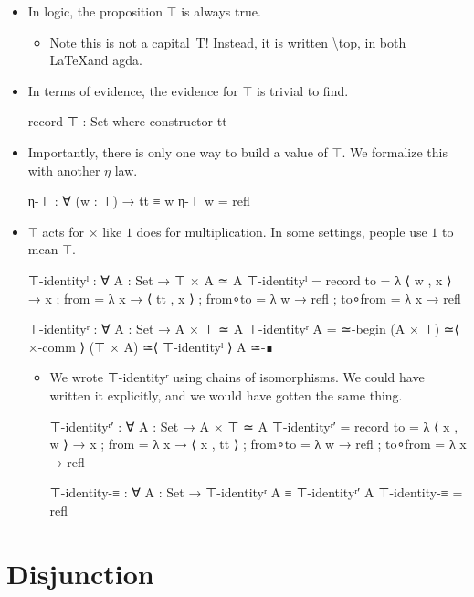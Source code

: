 \documentclass{lecturenotes}
\begin{document}
\begin{itemize}
\item In logic, the proposition $\top$ is always true.
  \begin{itemize}
  \item Note this is not a capital~T!
    Instead, it is written \textsf{\textbackslash{}top}, in both \LaTeX and agda.
  \end{itemize}
\item In terms of evidence, the evidence for $\top$ is trivial to find.
\begin{code}
record ⊤ : Set where
  constructor tt
\end{code}
\item Importantly, there is only one way to build a value of $\top$.
  We formalize this with another $\eta$ law.
\begin{code}
η-⊤ : ∀ (w : ⊤) → tt ≡ w
η-⊤ w = refl    
\end{code}
\item $\top$ acts for $\times$ like $1$ does for multiplication.
  In some settings, people use $1$ to mean $\top$.
\begin{code}
⊤-identityˡ : ∀ {A : Set} → ⊤ × A ≃ A
⊤-identityˡ =
  record
  {
    to      =  λ { ⟨ w , x ⟩ → x }
  ; from    =  λ {x → ⟨ tt , x ⟩ }
  ; from∘to = λ { w → refl}
  ; to∘from = λ {x → refl}
  }

⊤-identityʳ : ∀ {A : Set} → A × ⊤ ≃ A
⊤-identityʳ {A} =
  ≃-begin
    (A × ⊤)
  ≃⟨ ×-comm ⟩
    (⊤ × A)
  ≃⟨ ⊤-identityˡ ⟩
    A
  ≃-∎    
\end{code}
\begin{itemize}
\item We wrote \textsf{⊤-identityʳ} using chains of isomorphisms.
  We could have written it explicitly, and we would have gotten the same thing.
\begin{code}
⊤-identityʳ′ : ∀ {A : Set} → A × ⊤ ≃ A
⊤-identityʳ′ =
  record
  {
    to      =  λ { ⟨ x , w ⟩ → x }
  ; from    = λ { x → ⟨ x , tt ⟩ }
  ; from∘to =  λ { w → refl}
  ; to∘from =  λ {x → refl}
  }

⊤-identity-≡ : ∀ {A : Set} → ⊤-identityʳ {A} ≡ ⊤-identityʳ′ {A}
⊤-identity-≡ = refl
\end{code}
\end{itemize}
\end{itemize}

\section{Disjunction}
\label{sec:disjunction}
\end{document}

